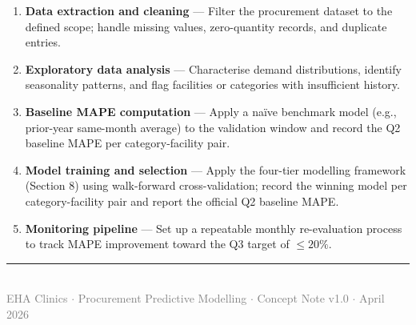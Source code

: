 \documentclass[12pt, a4paper]{article}
\begin{document}
\begin{enumerate}[leftmargin=1.5em, itemsep=6pt]
  \item \textbf{Data extraction and cleaning} --- Filter the procurement
        dataset to the defined scope; handle missing values, zero-quantity
        records, and duplicate entries.
  \item \textbf{Exploratory data analysis} --- Characterise demand
        distributions, identify seasonality patterns, and flag facilities or
        categories with insufficient history.
  \item \textbf{Baseline MAPE computation} --- Apply a na\"{i}ve benchmark
        model (e.g., prior-year same-month average) to the validation window
        and record the Q2 baseline MAPE per category-facility pair.
  \item \textbf{Model training and selection} --- Apply the four-tier
        modelling framework (Section 8) using walk-forward cross-validation;
        record the winning model per category-facility pair and report the
        official Q2 baseline MAPE.
  \item \textbf{Monitoring pipeline} --- Set up a repeatable monthly
        re-evaluation process to track MAPE improvement toward the Q3
        target of $\leq 20\%$.
\end{enumerate}

\vfill

\noindent\textcolor{ehaBlue!40!white}{\rule{\textwidth}{0.4pt}}\\[0.4em]
{\small\textcolor{gray}{EHA Clinics $\cdot$ Procurement Predictive Modelling $\cdot$
Concept Note v1.0 $\cdot$ April 2026}}
\end{document}
